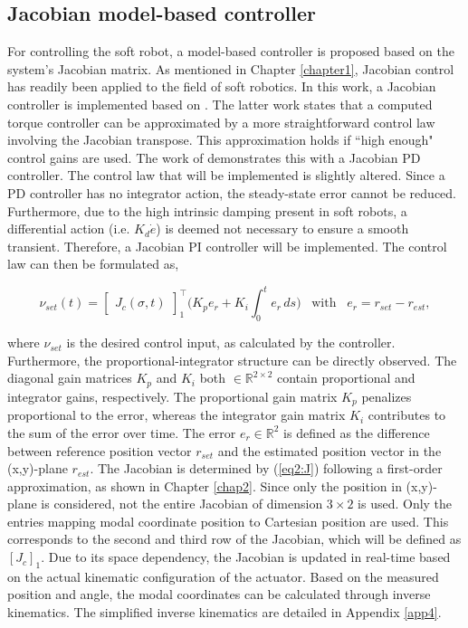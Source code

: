 \subsection{Jacobian model-based controller}


For controlling the soft robot, a model-based controller is proposed based on the system's Jacobian matrix. As mentioned in Chapter \ref{chapter1}, Jacobian control has readily been applied to the field of soft robotics. In this work, a Jacobian controller is implemented based on \cite{MOOSAVIAN20071226}. The latter work states that a computed torque controller can be approximated by a more straightforward control law involving the Jacobian transpose. This approximation holds if ``high enough" control gains are used. The work of \cite{MOOSAVIAN20071226} demonstrates this with a Jacobian PD controller. The control law that will be implemented is slightly altered. Since a PD controller has no integrator action, the steady-state error cannot be reduced. Furthermore, due to the high intrinsic damping present in soft robots, a differential action (i.e. $K_d \dot{e}$) is deemed not necessary to ensure a smooth transient. Therefore, a Jacobian PI controller will be implemented. The control law can then be formulated as,


\begin{equation}
    \nu_{set}(t) = \begin{bmatrix}J_c(\sigma,t)\end{bmatrix}_1^\top \Big(K_p e_r + K_i \int_0^t e_r \hspace{2pt} ds \Big) \hspace{10pt} \text{with} \hspace{10pt} e_r = r_{set}-r_{est}, 
    \label{eq:tau}
\end{equation}

where $\nu_{set}$ is the desired control input, as calculated by the controller. Furthermore, the proportional-integrator structure can be directly observed. The diagonal gain matrices $K_p$ and $K_i$ both  $ \in \mathbb{R}^{2\times 2}$ contain proportional and integrator gains, respectively. The proportional gain matrix $K_p$ penalizes proportional to the error, whereas the integrator gain matrix $K_i$ contributes to the sum of the error over time. The error $e_r \in \mathbb{R}^2$ is defined as the difference between reference position vector $r_{set}$ and the estimated position vector in the (x,y)-plane $r_{est}$. The Jacobian is determined by (\ref{eq2:J}) following a first-order approximation, as shown in Chapter \ref{chap2}. Since only the position in (x,y)-plane is considered, not the entire Jacobian of dimension $3 \times 2$ is used. Only the entries mapping modal coordinate position to Cartesian position are used. This corresponds to the second and third row of the Jacobian, which will be defined as $[J_c]_1$. Due to its space dependency, the Jacobian is updated in real-time based on the actual kinematic configuration of the actuator. Based on the measured position and angle, the modal coordinates can be calculated through inverse kinematics. The simplified inverse kinematics are detailed in Appendix \ref{app4}.

